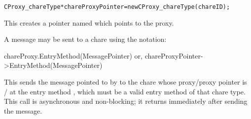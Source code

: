 \begin{alltt}
CProxy_chareType *chareProxyPointer = new CProxy_chareType(chareID);
\end{alltt}

This creates a pointer named  which points to the proxy. 

A message  may be sent to a chare using the
notation:

\begin{tabbing}
chareProxy.EntryMethod(MessagePointer)
or,
chareProxyPointer->EntryMethod(MessagePointer)
\end{tabbing}

This sends the message pointed to by  to the
chare whose proxy/proxy pointer is 
/ at the entry method 
,
which must be a valid entry method of that chare type. This call
is asynchronous and non-blocking; it returns immediately after sending the
message. 
